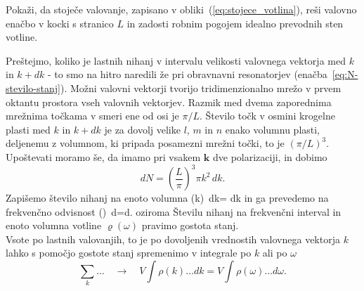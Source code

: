 \begin{definition}
 Pokaži, da stoječe valovanje, zapisano v obliki~(\ref{eq:stojece_votlina}), reši 
 valovno enačbo v kocki s stranico $L$ in zadosti robnim pogojem idealno prevodnih sten votline.
\end{definition}

\noindent
Preštejmo, koliko je lastnih nihanj v intervalu velikosti valovnega
vektorja med $k$ in $k+dk$ - to smo na hitro naredili že pri obravnavni
resonatorjev (enačba~\ref{eq:N-stevilo-stanj}). Možni valovni vektorji tvorijo tridimenzionalno
mrežo v prvem oktantu prostora vseh valovnih vektorjev. Razmik med
dvema zaporednima mrežnima točkama v smeri ene od osi je $\pi/L$.
Število točk v osmini krogelne plasti med $k$ in $k+dk$ je za dovolj
velike $l$, $m$ in $n$ enako volumnu plasti, deljenemu
z volumnom, ki pripada posamezni mrežni točki, to je $(\pi/L)^{3}$.
Upoštevati moramo še, da imamo pri vsakem $\mathbf{k}$ dve polarizaciji, in dobimo
\begin{equation}
dN=\left(\frac{L}{\pi}\right)^{3}\pi k^{2}\, dk.
\label{4.2}
\end{equation}
Zapišemo število nihanj na enoto volumna
\beq
\rho(k)\, dk= dk
\label{4.3}
\eeq
in ga prevedemo na frekvenčno odvisnost
\beq
\rho(\nu)\, d\nu=d\nu.
\eeq
oziroma
Številu nihanj na frekvenčni interval in enoto volumna votline $\varrho (\omega)$ 
pravimo gostota stanj.\\

\noindent
Vsote po lastnih valovanjih, to je po dovoljenih vrednostih valovnega vektorja $k$
lahko s pomočjo gostote stanj spremenimo v integrale po $k$ ali po $\omega$
\begin{equation}
\sum_{k}\ldots \quad \rightarrow \quad V\int\rho(k)\ldots dk=V\int\rho(\omega)\ldots d\omega.
\label{4.5}
\end{equation}


